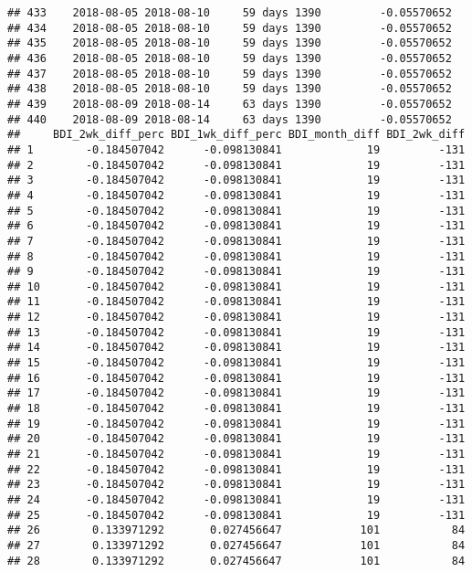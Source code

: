 \documentclass[]{article}
\begin{document}
\begin{verbatim}
## 433    2018-08-05 2018-08-10     59 days 1390         -0.05570652
## 434    2018-08-05 2018-08-10     59 days 1390         -0.05570652
## 435    2018-08-05 2018-08-10     59 days 1390         -0.05570652
## 436    2018-08-05 2018-08-10     59 days 1390         -0.05570652
## 437    2018-08-05 2018-08-10     59 days 1390         -0.05570652
## 438    2018-08-05 2018-08-10     59 days 1390         -0.05570652
## 439    2018-08-09 2018-08-14     63 days 1390         -0.05570652
## 440    2018-08-09 2018-08-14     63 days 1390         -0.05570652
##     BDI_2wk_diff_perc BDI_1wk_diff_perc BDI_month_diff BDI_2wk_diff
## 1        -0.184507042      -0.098130841             19         -131
## 2        -0.184507042      -0.098130841             19         -131
## 3        -0.184507042      -0.098130841             19         -131
## 4        -0.184507042      -0.098130841             19         -131
## 5        -0.184507042      -0.098130841             19         -131
## 6        -0.184507042      -0.098130841             19         -131
## 7        -0.184507042      -0.098130841             19         -131
## 8        -0.184507042      -0.098130841             19         -131
## 9        -0.184507042      -0.098130841             19         -131
## 10       -0.184507042      -0.098130841             19         -131
## 11       -0.184507042      -0.098130841             19         -131
## 12       -0.184507042      -0.098130841             19         -131
## 13       -0.184507042      -0.098130841             19         -131
## 14       -0.184507042      -0.098130841             19         -131
## 15       -0.184507042      -0.098130841             19         -131
## 16       -0.184507042      -0.098130841             19         -131
## 17       -0.184507042      -0.098130841             19         -131
## 18       -0.184507042      -0.098130841             19         -131
## 19       -0.184507042      -0.098130841             19         -131
## 20       -0.184507042      -0.098130841             19         -131
## 21       -0.184507042      -0.098130841             19         -131
## 22       -0.184507042      -0.098130841             19         -131
## 23       -0.184507042      -0.098130841             19         -131
## 24       -0.184507042      -0.098130841             19         -131
## 25       -0.184507042      -0.098130841             19         -131
## 26        0.133971292       0.027456647            101           84
## 27        0.133971292       0.027456647            101           84
## 28        0.133971292       0.027456647            101           84

\end{verbatim}
\end{document}
